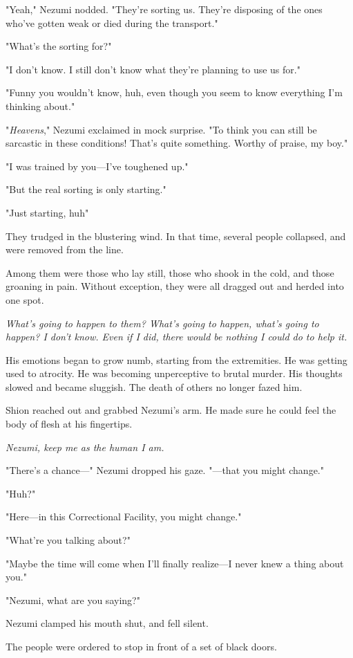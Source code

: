 "Yeah," Nezumi nodded. "They're sorting us. They're disposing of the
ones who've gotten weak or died during the transport."

"What's the sorting for?"

"I don't know. I still don't know what they're planning to use us for."

"Funny you wouldn't know, huh, even though you seem to know everything
I'm thinking about."

"\emph{Heavens}," Nezumi exclaimed in mock surprise. "To think you can
still be sarcastic in these conditions! That's quite something. Worthy
of praise, my boy."

"I was trained by you---I've toughened up."

"But the real sorting is only starting."

"Just starting, huh\el "

They trudged in the blustering wind. In that time, several people
collapsed, and were removed from the line.

Among them were those who lay still, those who shook in the cold, and
those groaning in pain. Without exception, they were all dragged out and
herded into one spot.

\emph{What's going to happen to them? What's going to happen, what's
going to happen? I don't know. Even if I did, there would be nothing I
could do to help it.}

His emotions began to grow numb, starting from the extremities. He was
getting used to atrocity. He was becoming unperceptive to brutal murder.
His thoughts slowed and became sluggish. The death of others no longer
fazed him.

Shion reached out and grabbed Nezumi's arm. He made sure he could feel
the body of flesh at his fingertips.

\emph{Nezumi, keep me as the human I am.}

"There's a chance---" Nezumi dropped his gaze. "---that you might change."

"Huh?"

"Here---in this Correctional Facility, you might change."

"What're you talking about?"

"Maybe the time will come when I'll finally realize---I never knew a thing
about you."

"Nezumi, what are you saying?"

Nezumi clamped his mouth shut, and fell silent.

The people were ordered to stop in front of a set of black doors.

